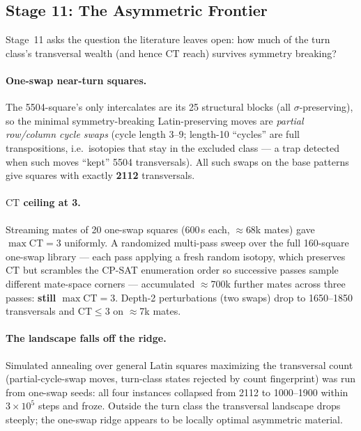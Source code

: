 \documentclass[11pt,a4paper]{article}
\theoremstyle{remark}
\newcommand{\CT}{\mathrm{CT}}
\begin{document}
\subsection{Stage 11: The Asymmetric Frontier}
\label{sec:stage11}

Stage~11 asks the question the literature leaves open: how much of the turn
class's transversal wealth (and hence $\CT$ reach) survives symmetry
breaking?

\paragraph{One-swap near-turn squares.} The 5504-square's only intercalates
are its 25 structural blocks (all $\sigma$-preserving), so the minimal
symmetry-breaking Latin-preserving moves are \emph{partial row/column cycle
swaps} (cycle length $3$--$9$; length-10 ``cycles'' are full transpositions,
i.e.\ isotopies that stay in the excluded class --- a trap detected when such
moves ``kept'' 5504 transversals). All such swaps on the base patterns give
squares with exactly \textbf{2112} transversals.

\paragraph{$\CT$ ceiling at 3.} Streaming mates of 20 one-swap squares
(600\,s each, $\approx$68k mates) gave $\max \CT = 3$ uniformly. A
randomized multi-pass sweep over the full 160-square one-swap library ---
each pass applying a fresh random isotopy, which preserves $\CT$ but
scrambles the CP-SAT enumeration order so successive passes sample
different mate-space corners --- accumulated $\approx$700k further mates
across three passes: \textbf{still $\max \CT = 3$}. Depth-2 perturbations
(two swaps) drop to 1650--1850 transversals and $\CT \leq 3$ on
$\approx$7k mates.

\paragraph{The landscape falls off the ridge.} Simulated annealing over
general Latin squares maximizing the transversal count (partial-cycle-swap
moves, turn-class states rejected by count fingerprint) was run from
one-swap seeds: all four instances collapsed from 2112 to 1000--1900 within
$3\times10^5$ steps and froze. Outside the turn class the transversal
landscape drops steeply; the one-swap ridge appears to be locally optimal
asymmetric material.
\end{document}

